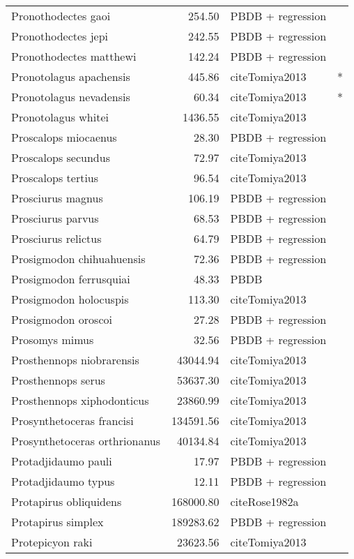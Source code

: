 \begin{table}[ht]
\begin{tabular}{lrll}
  Pronothodectes gaoi & 254.50 & PBDB + regression &  \\ 
  Pronothodectes jepi & 242.55 & PBDB + regression &  \\ 
  Pronothodectes matthewi & 142.24 & PBDB + regression &  \\ 
  Pronotolagus apachensis & 445.86 & cite{Tomiya2013} & * \\ 
  Pronotolagus nevadensis & 60.34 & cite{Tomiya2013} & * \\ 
  Pronotolagus whitei & 1436.55 & cite{Tomiya2013} &  \\ 
  Proscalops miocaenus & 28.30 & PBDB + regression &  \\ 
  Proscalops secundus & 72.97 & cite{Tomiya2013} &  \\ 
  Proscalops tertius & 96.54 & cite{Tomiya2013} &  \\ 
  Prosciurus magnus & 106.19 & PBDB + regression &  \\ 
  Prosciurus parvus & 68.53 & PBDB + regression &  \\ 
  Prosciurus relictus & 64.79 & PBDB + regression &  \\ 
  Prosigmodon chihuahuensis & 72.36 & PBDB + regression &  \\ 
  Prosigmodon ferrusquiai & 48.33 & PBDB &  \\ 
  Prosigmodon holocuspis & 113.30 & cite{Tomiya2013} &  \\ 
  Prosigmodon oroscoi & 27.28 & PBDB + regression &  \\ 
  Prosomys mimus & 32.56 & PBDB + regression &  \\ 
  Prosthennops niobrarensis & 43044.94 & cite{Tomiya2013} &  \\ 
  Prosthennops serus & 53637.30 & cite{Tomiya2013} &  \\ 
  Prosthennops xiphodonticus & 23860.99 & cite{Tomiya2013} &  \\ 
  Prosynthetoceras francisi & 134591.56 & cite{Tomiya2013} &  \\ 
  Prosynthetoceras orthrionanus & 40134.84 & cite{Tomiya2013} &  \\ 
  Protadjidaumo pauli & 17.97 & PBDB + regression &  \\ 
  Protadjidaumo typus & 12.11 & PBDB + regression &  \\ 
  Protapirus obliquidens & 168000.80 & cite{Rose1982a} &  \\ 
  Protapirus simplex & 189283.62 & PBDB + regression &  \\ 
  Protepicyon raki & 23623.56 & cite{Tomiya2013} &  \\ 

\end{tabular}
\end{table}
